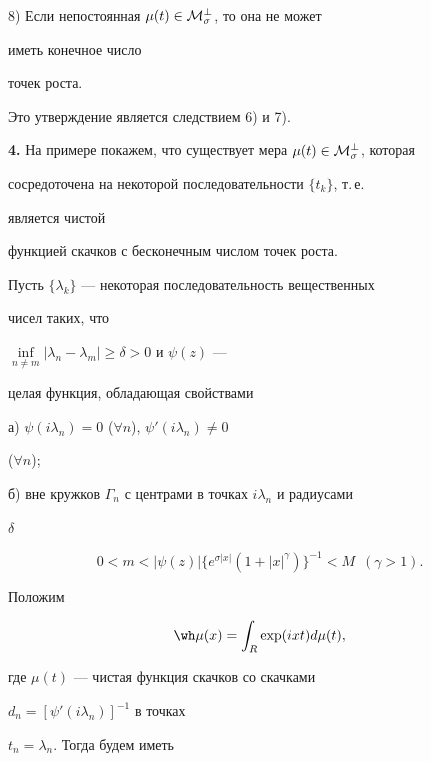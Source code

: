  


8) Если непостоянная $\mu(t)\in\cal M^\bot_\sigma$, то она не может 


иметь конечное число 


точек роста. 


Это утверждение является следствием 6) и 7). 


\medskip 


 


{\bf 4.} На примере покажем, что существует мера $\mu(t)\in\cal 


M^\bot_\sigma$, которая 


сосредоточена на некоторой последовательности $\{t_k\}$, т.\,е. 


является чистой 


функцией скачков с бесконечным числом точек роста. 


 


Пусть $\{\lambda_k\}$ --- некоторая последовательность вещественных 


чисел таких, что 


$\inf\limits_{n\ne m}|\lambda_n-\lambda_m|\ge\delta>0$ и $\psi(z)$ --- 


целая функция, обладающая свойствами 


 


а) $\psi(i\lambda_n)=0$ ($\forall n$), $\psi'(i\lambda_n)\ne0$ 


($\forall n$); 


 


б) вне кружков $\Gamma_n$ с центрами в точках $i\lambda_n$ и радиусами 


$\delta$ 


$$ 


0<m<|\psi(z)|\{e^{\sigma|x|}(1+|x|^\gamma)\}^{-1}<M\ \; (\gamma>1). 


$$ 


 


Положим 


$$ 


\wh\mu(x)=\int_R\exp(ixt)d\mu(t), 


$$ 


где $\mu(t)$ --- чистая функция скачков со скачками 


$d_n=[\psi'(i\lambda_n)]^{-1}$ в точках 


$t_n=\lambda_n$. Тогда будем иметь 


